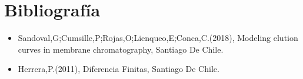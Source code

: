 \section{Bibliografía}

\begin{itemize}
\item Sandoval,G;Cumsille,P;Rojas,O;Lienqueo,E;Conca,C.(2018), Modeling elution curves in membrane chromatography, Santiago De Chile.
\item Herrera,P.(2011), Diferencia Finitas, Santiago De Chile.
\end{itemize}